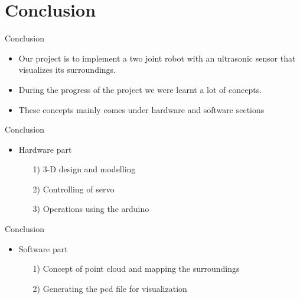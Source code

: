 \documentclass{beamer}
\begin{document}
\section{Conclusion}
\begin{frame}{Conclusion}
\begin{itemize}
    \item Our project is to implement a two joint robot with an ultrasonic sensor that visualizes its surroundings.
    \item During the progress of the project we were learnt a lot of concepts.
    \item These concepts mainly comes under hardware and software sections 
    
\end{itemize}
\end{frame}
\begin{frame}{Conclusion}
\begin{itemize}
   \item Hardware part
   \begin{itemize}
       \item[1)]3-D design and modelling
       \item[2)]Controlling of servo 
       \item[3)]Operations using the arduino
   \end{itemize}
\end{itemize}
\end{frame}
\begin{frame}{Conclusion}
    \begin{itemize}
        \item Software part
        \begin{itemize}
            \item[1)]Concept of point cloud and mapping the surroundings
            \item[2)]Generating the pcd file for visualization
        \end{itemize}
    \end{itemize}
\end{frame}
\end{document}
